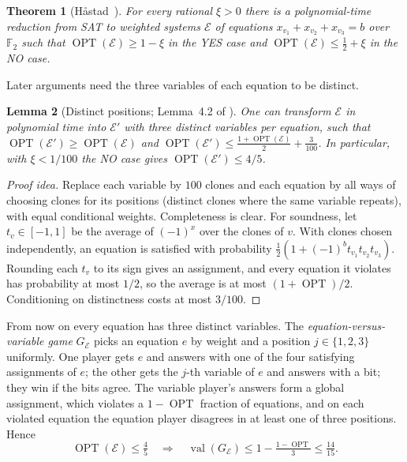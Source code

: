 \documentclass[11pt]{article}
\newtheorem{theorem}{Theorem}[section]
\newtheorem{lemma}[theorem]{Lemma}
\theoremstyle{definition}
\theoremstyle{remark}
\newcommand{\F}{\mathbb F}
\newcommand{\cE}{\mathcal E}
\DeclareMathOperator{\OPT}{OPT}
\DeclareMathOperator{\val}{val}
\begin{document}
\begin{theorem}[H{\aa}stad~{\cite[Thm.~5.4]{Hastad01}}]\label{thm:parity}
For every rational $\xi>0$ there is a polynomial-time reduction from SAT to
weighted systems $\cE$ of equations $x_{v_1}+x_{v_2}+x_{v_3}=b$ over $\F_2$ such
that $\OPT(\cE)\ge1-\xi$ in the YES case and $\OPT(\cE)\le\frac12+\xi$ in the
NO case.
\end{theorem}

Later arguments need the three variables of each equation to be distinct.

\begin{lemma}[Distinct positions; Lemma~4.2 of \cite{OpenAI-UGC}]\label{lem:distinct}
One can transform $\cE$ in polynomial time into $\cE'$ with three distinct
variables per equation, such that $\OPT(\cE')\ge\OPT(\cE)$ and
$\OPT(\cE')\le\frac{1+\OPT(\cE)}2+\frac3{100}$. In particular, with
$\xi<1/100$ the NO case gives $\OPT(\cE')\le4/5$.
\end{lemma}

\begin{proof}[Proof idea]
Replace each variable by $100$ clones and each equation by all ways of choosing
clones for its positions (distinct clones where the same variable repeats),
with equal conditional weights. Completeness is clear. For soundness, let
$t_v\in[-1,1]$ be the average of $(-1)^{x}$ over the clones of $v$. With clones
chosen independently, an equation is satisfied with probability
$\tfrac12(1+(-1)^b t_{v_1}t_{v_2}t_{v_3})$. Rounding each $t_v$ to its sign
gives an assignment, and every equation it violates has probability at most
$1/2$, so the average is at most $(1+\OPT)/2$. Conditioning on distinctness
costs at most $3/100$.
\end{proof}

From now on every equation has three distinct variables. The
\emph{equation-versus-variable game} $G_\cE$ picks an equation $e$ by weight and
a position $j\in\{1,2,3\}$ uniformly. One player gets $e$ and answers with one
of the four satisfying assignments of $e$; the other gets the $j$-th variable of
$e$ and answers with a bit; they win if the bits agree. The variable player's
answers form a global assignment, which violates a $1-\OPT$ fraction of
equations, and on each violated equation the equation player disagrees in at
least one of three positions. Hence
\begin{equation}\label{eq:base-gap}
\OPT(\cE)\le\tfrac45\quad\Longrightarrow\quad \val(G_\cE)\le1-\tfrac{1-\OPT}{3}\le\tfrac{14}{15}.
\end{equation}
\end{document}

